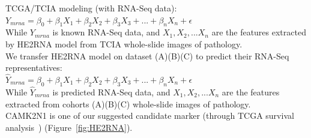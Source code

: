 \documentclass[12pt, a4paper]{article}
\begin{document}





TCGA/TCIA modeling (with RNA-Seq data):\\[0.2cm]
$Y_{mrna} = \beta_0 + \beta_1 X_1 + \beta_2 X_2 + \beta_3 X_3 + ... + \beta_n X_n + \epsilon$\\[0.3cm]
While 
$Y_{mrna}$ is known RNA-Seq data, and
$X_1, X_2, ...X_n$ are the features extracted by HE2RNA model from TCIA whole-slide images of pathology.\\[0.5cm]

We transfer HE2RNA model on dataset (A)(B)(C) to predict their RNA-Seq representatives:\\[0.2cm]
$\hat{Y}_{mrna} = \beta_0 + \beta_1 X_1 + \beta_2 X_2 + \beta_3 X_3 + ... + \beta_n X_n + \epsilon$\\[0.3cm]
While $\hat{Y}_{mrna}$ is predicted RNA-Seq data, and
$X_1, X_2, ...X_n$ are the features extracted from cohorts (A)(B)(C) whole-slide images of pathology.\\
CAMK2N1 is one of our suggested candidate marker (through TCGA survival analysis~\citep{Chi2021}) (Figure~\ref{fig:HE2RNA}).
\end{document}
